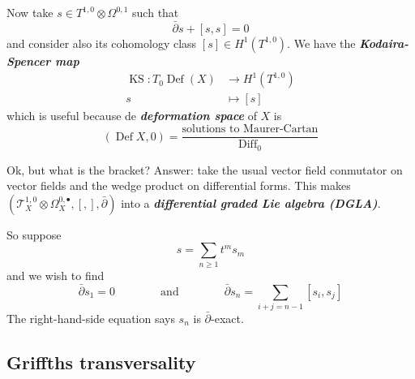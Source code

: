 \documentclass{article}
\numberwithin{equation}{section}
\newcommand{\Tc}{\mathcal{T}}
\DeclareMathOperator{\Def}{Def}
\DeclareMathOperator{\Diff}{Diff}
\renewcommand{\Def}{\operatorname{Def}}
\begin{document}
\vspace{2em}
Now take $s\in T^{1,0}\otimes\Omega^{0,1}$ such that
\[\bar\partial s+[s,s]=0\]
and consider also its cohomology class $[s]\in H^1(T^{1,0})$. We have the \textbf{\textit{Kodaira-Spencer map}}
\begin{align*}
	\operatorname{KS}:T_0\Def(X)&\to H^1(T^{1,0})\\
	s&\mapsto [s]
\end{align*}
which is useful because de \textbf{\textit{deformation space}} of $X$ is
\[(\Def X,0)=\frac{\text{solutions to Maurer-Cartan}}{\Diff_0}\]

Ok, but what is the bracket? Answer: take the usual vector field conmutator on vector fields and the wedge product on differential forms. This makes $(\Tc^{1,0}_X\otimes \Omega^{0,\bullet}_X,[,],\bar\partial)$ into a \textbf{\textit{differential graded Lie algebra (DGLA)}}.

So suppose
\[s=\sum_{n\geq1}t^ms_m\]
and we wish to find
\[\bar\partial s_1=0\qquad\qquad\text{and}\qquad\qquad \bar\partial s_n=\sum_{i+j=n-1}[s_i,s_j]\]
The right-hand-side equation says $s_n$ is $\bar\partial$-exact.

\subsection{Griffths transversality}

\end{document}
